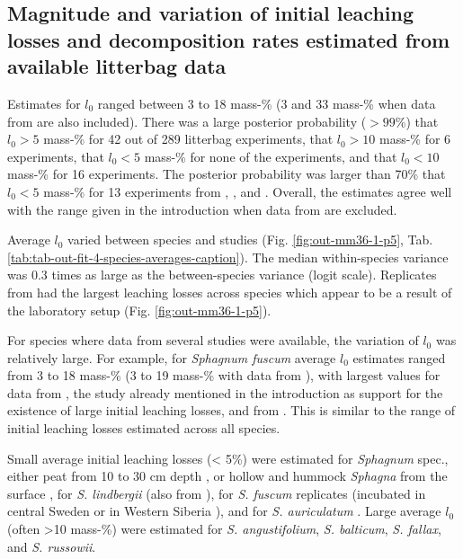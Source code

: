 \documentclass[bg, manuscript]{copernicus}
\begin{document}
\hypertarget{out-res-1}{%
\subsection{Magnitude and variation of initial leaching losses and decomposition rates estimated from available litterbag data}\label{out-res-1}}

Estimates for \(l_0\) ranged between 3 to 18 mass-\% (3 and 33 mass-\% when data from \citet{Bengtsson.2017} are also included). There was a large posterior probability (\(>99\)\%) that \(l_0>5\) mass-\% for 42 out of 289 litterbag experiments, that \(l_0>10\) mass-\% for 6 experiments, that \(l_0<5\) mass-\% for none of the experiments, and that \(l_0<10\) mass-\% for 16 experiments. The posterior probability was larger than 70\% that \(l_0<5\) mass-\% for 13 experiments from \citet{Bartsch.1985}, \citet{Prevost.1997}, and \citet{Golovatskaya.2017}. Overall, the estimates agree well with the range given in the introduction when data from \citet{Bengtsson.2017} are excluded.

Average \(l_0\) varied between species and studies (Fig. \ref{fig:out-mm36-1-p5}, Tab. \ref{tab:tab-out-fit-4-species-averages-caption}). The median within-species variance was 0.3 times as large as the between-species variance (logit scale). Replicates from \citet{Bengtsson.2017} had the largest leaching losses across species which appear to be a result of the laboratory setup (Fig. \ref{fig:out-mm36-1-p5}).

For species where data from several studies were available, the variation of \(l_0\) was relatively large. For example, for \emph{Sphagnum fuscum} average \(l_0\) estimates ranged from 3 to 18 mass-\% (3 to 19 mass-\% with data from \citet{Bengtsson.2017}), with largest values for data from \citet{Thormann.2001}, the study already mentioned in the introduction as support for the existence of large initial leaching losses, and from \citet{Asada.2005b}. This is similar to the range of initial leaching losses estimated across all species.

Small average initial leaching losses (\textless{} 5\%) were estimated for \emph{Sphagnum} spec., either peat from 10 to 30 cm depth \citep{Prevost.1997}, or hollow and hummock \emph{Sphagna} from the surface \citep{Bartsch.1985}, for \emph{S. lindbergii} (also from \citet{Bartsch.1985}), for \emph{S. fuscum} replicates (incubated in central Sweden \citep{Breeuwer.2008} or in Western Siberia \citep{Golovatskaya.2017}), and for \emph{S. auriculatum} \citep{Trinder.2008}. Large average \(l_0\) (often \textgreater10 mass-\%) were estimated for \emph{S. angustifolium}, \emph{S. balticum}, \emph{S. fallax}, and \emph{S. russowii}.
\end{document}
